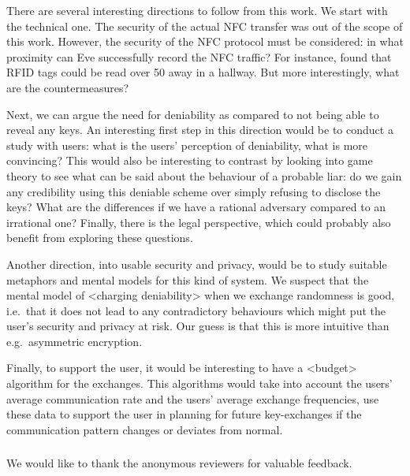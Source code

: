 There are several interesting directions to follow from this work.
We start with the technical one.
The security of the actual \ac{NFC} transfer was out of the scope of this work.
However, the security of the \ac{NFC} protocol must be considered: in what 
proximity can Eve successfully record the \ac{NFC} traffic?
For instance, \citet{RFIDProximity} found that RFID tags could be read over 
\unit{50}{\metre} away in a hallway.
But more interestingly, what are the countermeasures?

Next, we can argue the need for deniability as compared to not being able to 
reveal any keys.
An interesting first step in this direction would be to conduct a study with 
users: what is the users' perception of deniability, what is more convincing?
This would also be interesting to contrast by looking into game theory to see 
what can be said about the behaviour of a probable liar: do we gain any 
credibility using this deniable scheme over simply refusing to disclose the 
keys?
What are the differences if we have a rational adversary compared to an 
irrational one?
Finally, there is the legal perspective, which could probably also benefit from 
exploring these questions.

Another direction, into usable security and privacy, would be to study suitable 
metaphors and mental models for this kind of system.
We suspect that the mental model of <charging deniability> when we exchange 
randomness is good, i.e.~that it does not lead to any contradictory behaviours 
which might put the user's security and privacy at risk.
Our guess is that this is more intuitive than e.g.~asymmetric encryption.

Finally, to support the user, it would be interesting to have a <budget> 
algorithm for the exchanges.
This algorithms would take into account the users' average communication rate 
and the users' average exchange frequencies, use these data to support the user 
in planning for future key-exchanges if the communication pattern changes or 
deviates from normal.


\subsubsection*{\ackname}

We would like to thank the anonymous reviewers for valuable feedback.


\printbibliography{}


